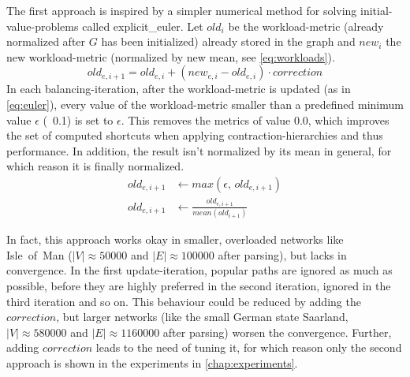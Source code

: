         The first approach is inspired by a simpler numerical method for solving initial-value-problems called \gls{explicit_euler}.
        Let $\mathit{old}_i$ be the workload-\gls{metric} (already normalized after $G$ has been initialized) already stored in the graph and $\mathit{new}_i$ the new workload-\gls{metric} (normalized by new mean, see \vref{eq:workloads}).
        \begin{equation}
        \label{eq:euler}
            \mathit{old}_{e,i+1} = \mathit{old}_{e,i} + (\mathit{new}_{e,i} - \mathit{old}_{e,i}) \cdot \mathit{correction}
        \end{equation}
        In each \gls{balancing}-iteration, after the workload-\gls{metric} is updated (as in \vref{eq:euler}), every value of the workload-\gls{metric} smaller than a predefined minimum value $\epsilon$ (\eg\ \num{0.1}) is set to $\epsilon$.
        This removes the \glspl{metric} of value \num{0.0}, which improves the set of computed shortcuts when applying \gls{contraction-hierarchies} and thus performance.
        In addition, the result isn't normalized by its mean in general, for which reason it is finally normalized.
        \begin{equation}
        \label{eq:metric_cleanup}
        \begin{aligned}
            \mathit{old}_{e,i+1} &\leftarrow \mathit{max} \left( \epsilon \text{,\ } \mathit{old}_{e,i+1} \right)\\
            \mathit{old}_{e,i+1} &\leftarrow \frac{\mathit{old}_{e,i+1}}{\mathit{mean}(\mathit{old}_{i+1})}
        \end{aligned}
        \end{equation}

        In fact, this approach works okay in smaller, overloaded networks like Isle~of~Man ($|V| \approx \num{50000}$ and $|E| \approx \num{100000}$ after parsing), but lacks in convergence.
        In the first update-iteration, popular paths are ignored as much as possible, before they are highly preferred in the second iteration, ignored in the third iteration and so on.
        This behaviour could be reduced by adding the $\mathit{correction}$, but larger networks (like the small German state Saarland, $|V| \approx \num{580000}$ and $|E| \approx \num{1160000}$ after parsing) worsen the convergence.
        Further, adding $\mathit{correction}$ leads to the need of tuning it, for which reason only the second approach is shown in the experiments in \vref{chap:experiments}.

